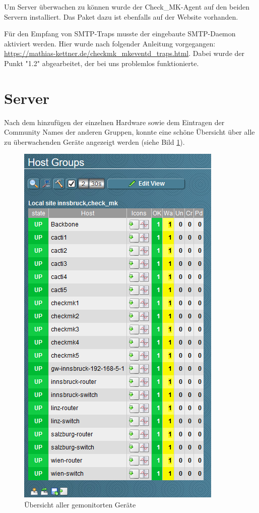 Um Server überwachen zu können wurde der Check\_MK-Agent auf den beiden Servern installiert. Das Paket dazu ist ebenfalls auf der Website vorhanden.

Für den Empfang von SMTP-Traps musste der eingebaute SMTP-Daemon aktiviert werden. Hier wurde nach folgender Anleitung vorgegangen: \url{https://mathias-kettner.de/checkmk_mkeventd_traps.html}. Dabei wurde der Punkt "1.2" abgearbeitet, der bei uns problemlos funktionierte.

\section{Server}

Nach dem hinzufügen der einzelnen Hardware sowie dem Eintragen der Community Names der anderen Gruppen, konnte eine schöne Übersicht über alle zu überwachenden Geräte angezeigt werden (siehe Bild \ref{img:uebersicht}).

\begin{figure}[H]
	\centering
	\includegraphics[scale=1]{img/hostgroups.PNG}
	\caption{Übersicht aller gemonitorten Geräte}
	\label{img:uebersicht}
\end{figure}

